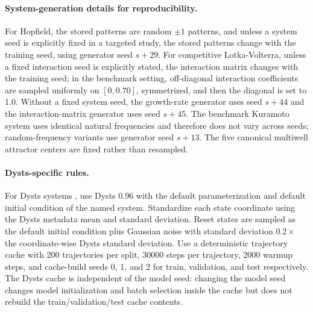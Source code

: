 \paragraph{System-generation details for reproducibility.}
For Hopfield, the stored patterns are random $\pm 1$ patterns, and unless a
system seed is explicitly fixed in a targeted study, the stored patterns change
with the training seed, using generator seed $s + 29$. For competitive
Lotka-Volterra, unless a fixed interaction seed is explicitly stated, the
interaction matrix changes with the training seed; in the benchmark setting,
off-diagonal interaction coefficients are sampled uniformly on $[0,0.70]$,
symmetrized, and then the diagonal is set to 1.0. Without a fixed system seed,
the growth-rate generator uses seed $s + 44$ and the interaction-matrix
generator uses seed $s + 45$. The benchmark Kuramoto system uses identical
natural frequencies and therefore does not vary across seeds; random-frequency
variants use generator seed $s + 13$. The five canonical multiwell attractor
centers are fixed rather than resampled.

\paragraph{Dysts-specific rules.}
For Dysts systems \citep{gilpin_chaos_2021, gilpin_model_2023}, use Dysts 0.96 with the default parameterization and default initial condition of the named system. 
Standardize each state coordinate using the Dysts metadata mean and standard deviation. Reset states are sampled as the default initial condition plus Gaussian noise with standard deviation $0.2 \times$ the coordinate-wise Dysts standard deviation. 
Use a deterministic trajectory cache with 200 trajectories per split, 30000 steps per trajectory, 2000 warmup steps, and cache-build seeds 0, 1, and 2 for train, validation, and test respectively. 
The Dysts cache is independent of the model seed: changing the model seed changes model initialization and batch selection inside the cache but does not rebuild the train/validation/test cache contents.

